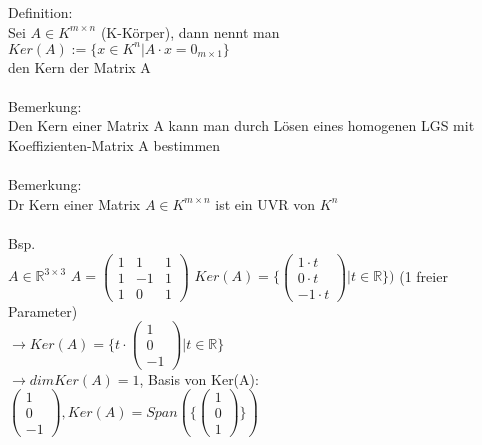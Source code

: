 \documentclass{scrartcl}
\begin{document}
\begin{enumerate}
	Definition:\\
	Sei $A \in K^{m \times n}$ (K-Körper), dann nennt man \\
	$Ker(A):= \{x \in K^n \vert A \cdot x = 0_{m \times 1}\}$\\
	den Kern der Matrix A\\\\
	Bemerkung:\\
	Den Kern einer Matrix A kann man durch Lösen eines homogenen LGS mit Koeffizienten-Matrix A bestimmen\\\\
	Bemerkung:\\
	Dr Kern einer Matrix $A \in K^{m \times n}$ ist ein UVR von $K ^ n$\\\\
	Bsp.\\
	$A \in \mathbb{R}^{3 \times 3}$ \hspace{1cm} $A = \begin{pmatrix}
		1 & 1 & 1 \\ 1 & -1 & 1 \\ 1 & 0 & 1
	\end{pmatrix}$ \hspace{2cm} $Ker(A)=\{ \begin{pmatrix}
		1 \cdot t \\ 0 \cdot t \\ -1 \cdot t
	\end{pmatrix} \vert t \in \mathbb{R}  \})$ (1 freier Parameter)\\
	$\rightarrow Ker(A)= \{ t \cdot \begin{pmatrix}
		1 \\ 0 \\ -1
	\end{pmatrix} \vert t \in \mathbb{R} \}$\\
	$\rightarrow dim Ker(A) = 1$, Basis von Ker(A): $\begin{pmatrix}
		1 \\ 0 \\ -1
	\end{pmatrix}, Ker(A)=Span(\{ \begin{pmatrix}
		1 \\ 0 \\ 1
	\end{pmatrix}  \})$
	

\end{enumerate}
\end{document}
